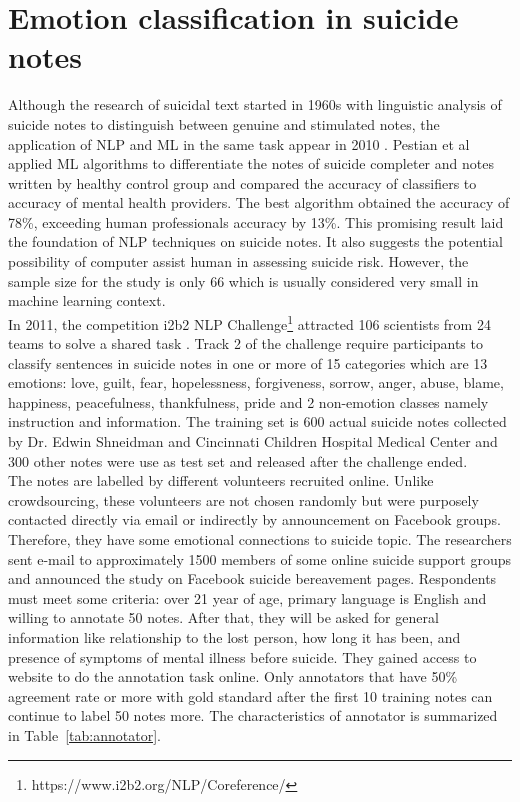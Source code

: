 \section{Emotion classification in suicide notes}
Although the research of suicidal text started in 1960s with linguistic analysis of suicide notes to distinguish between genuine and stimulated notes, the application of NLP and ML in the same task appear in 2010 \cite{Desmet2013}. Pestian et al \cite{Pestian2010} applied ML algorithms to differentiate the notes of suicide completer and notes written by healthy control group and compared the accuracy of classifiers to accuracy of mental health providers. The best algorithm obtained the accuracy of 78\%, exceeding human professionals accuracy by 13\%. This promising result laid the foundation of NLP techniques on suicide notes. It also suggests the potential possibility of computer assist human in assessing suicide risk. However, the sample size for the study is only 66 which is usually considered very small in machine learning context.\\
In 2011, the competition i2b2 NLP Challenge\footnote{https://www.i2b2.org/NLP/Coreference/} attracted 106 scientists from 24 teams to solve a shared task \cite{Pestian2012}. Track 2 of the challenge require participants to classify sentences in suicide notes in one or more of 15 categories which are 13 emotions: love, guilt, fear, hopelessness, forgiveness, sorrow, anger, abuse, blame, happiness, peacefulness, thankfulness, pride  and 2 non-emotion classes namely instruction and information. The training set is 600 actual suicide notes collected by Dr. Edwin Shneidman and Cincinnati Children Hospital Medical Center and 300 other notes were use as test set and released after the challenge ended.\\
The notes are labelled by different volunteers recruited online. Unlike crowdsourcing, these volunteers are not chosen randomly but were purposely contacted directly via email or indirectly by announcement on Facebook groups. Therefore, they have some emotional connections to suicide topic. The researchers sent e-mail to approximately 1500 members of some online suicide support groups and announced the study on Facebook suicide bereavement pages. Respondents must meet some criteria: over 21 year of age, primary language is English and willing to annotate 50 notes. After that, they will be asked for general information like relationship to the lost person, how long it has been, and presence of symptoms of mental illness before suicide. They gained access to website to do the annotation task online. Only annotators that have 50\% agreement rate or more with gold standard after the first 10 training notes can continue to label 50 notes more. The characteristics of annotator is summarized in Table~\ref{tab:annotator}.\\
